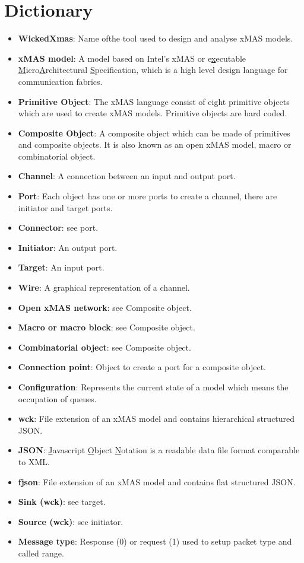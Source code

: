 \documentclass[a4paper,11pt,final]{article}
\begin{document}
\section{Dictionary}
\begin{itemize}
	\item \textbf{WickedXmas}: Name ofthe tool used to design and analyse xMAS models.
	\item \textbf{xMAS model}:
	A model based on Intel's xMAS or e\underline{x}ecutable \underline{M}icro\underline{A}rchitectural \underline{S}pecification,
	which is a high level design language for communication fabrics.
	\item \textbf{Primitive Object}: The xMAS language consist of eight primitive objects which are used to create xMAS models.
	Primitive objects are hard coded.
	\item \textbf{Composite Object}: A composite object which can be made of primitives and composite objects.
	It is also known as an open xMAS model, macro or combinatorial object.
	\item \textbf{Channel}: A connection between an input and output port.
	\item \textbf{Port}: Each object has one or more ports to create a channel, there are initiator and target ports.
	\item \textbf{Connector}: see port.
	\item \textbf{Initiator}: An output port.
	\item \textbf{Target}: An input port.
	\item \textbf{Wire}: A graphical representation of a channel.
	\item \textbf{Open xMAS network}: see Composite object.
	\item \textbf{Macro or macro block}: see Composite object.
	\item \textbf{Combinatorial object}: see Composite object.
	\item \textbf{Connection point}: Object to create a port for a composite object.
	\item \textbf{Configuration}: Represents the current state of a model which means the occupation of queues.
	\item \textbf{wck}: File extension of an xMAS model and contains hierarchical structured JSON.
	\item \textbf{JSON}: \underline{J}avascript \underline{O}bject \underline{N}otation is a readable data file format comparable to XML.
	\item \textbf{fjson}: File extension of an xMAS model and contains flat structured JSON.
	\item \textbf{Sink (wck)}: see target. 
	\item \textbf{Source (wck)}: see initiator.
	\item \textbf{Message type}: Response (0) or request (1) used to setup packet type and called range.
\end{itemize}
\end{document}
